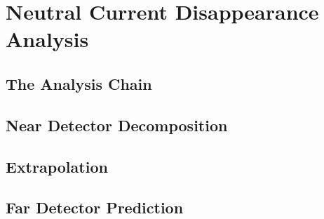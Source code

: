 \chapter{Neutral Current Disappearance Analysis}

\section{The Analysis Chain}

\section{Near Detector Decomposition}

\section{Extrapolation}

\section{Far Detector Prediction}
